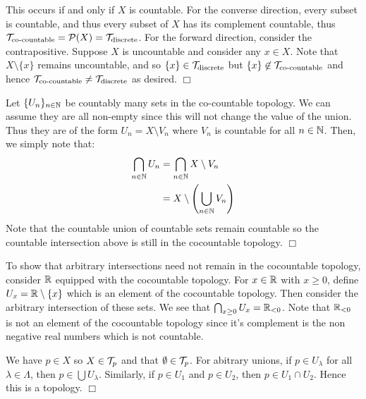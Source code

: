 \documentclass{article}
\begin{document}
{\begin{spacedenumerate}
        \item This occurs if and only if $X$ is countable. For the converse direction, every subset is countable, and thus every subset of $X$ has its complement countable, thus $\mathcal{T}_{\text{co-countable}} = \mathcal{P}(X) = \mathcal{T}_{\text{discrete}}$. For the forward direction, consider the contrapositive. Suppose $X$ is uncountable and consider any $x\in X$. Note that $X\setminus\{x\}$ remains uncountable, and so $\{x\} \in \mathcal{T}_{\text{discrete}}$ but $\{x\}\not\in \mathcal{T}_{\text{co-countable}}$ and hence $\mathcal{T}_{\text{co-countable}} \neq \mathcal{T}_{\text{discrete}}$ as desired. $\Box$ 
    \end{spacedenumerate}
}

 {
    Let $\{U_{n}\}_{n\in \mathbb{N}}$ be countably many sets in the co-countable topology. We can assume they are all non-empty since this will not change the value of the union. Thus they are of the form $U_{n} = X\setminus V_{n}$ where $V_{n}$ is countable for all $n\in \mathbb{N}$. Then, we simply note that:
    \begin{align*}
        \bigcap_{n\in \mathbb{N}}U_{n} &= \bigcap_{n\in\mathbb{N}} X\setminus V_{n}\\
        &= X\setminus\left(\bigcup_{n\in\mathbb{N}} V_{n}\right)
    \end{align*} 
    Note that the countable union of countable sets remain countable so the countable intersection above is still in the cocountable topology. $\Box$

    To show that arbitrary intersections need not remain in the cocountable topology, consider $\mathbb{R}$ equipped with the cocountable topology. For $x \in \mathbb{R}$ with $x\geq 0$, define $U_{x} = \mathbb{R} \setminus \{x\}$ which is an element of the cocountable topology. Then consider the arbitrary intersection of these sets. We see that $\bigcap_{x\geq 0} U_{x} = \mathbb{R}_{< 0}$. Note that $\mathbb{R}_{< 0}$ is not an element of the cocountable topology since it's complement is the non negative real numbers which is not countable.
}
 {
    We have $p\in X$ so $X\in \mathcal{T}_{p}$ and that $\emptyset \in \mathcal{T}_{p}$. For abitrary unions, if $p\in U_{\lambda}$ for all $\lambda \in \Lambda$, then $p\in \bigcup U_{\lambda}$. Similarly, if $p\in U_{1}$ and $p\in U_{2}$, then $p\in U_{1}\cap U_{2}$. Hence this is a topology. $\Box$
}
\end{document}
